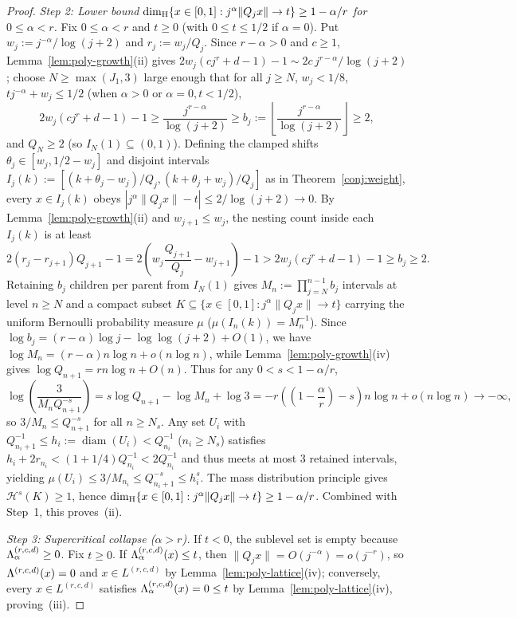 \begin{proof}
\emph{Step 2: Lower bound $\dim_{\mathrm{H}}\{x\in[0,1]:j^\alpha\|Q_jx\|\to t\}\ge1-\alpha/r$
for $0\le\alpha<r$.} Fix $0\le\alpha<r$ and $t\ge0$ (with $0\le t\le1/2$ if
$\alpha=0$). Put $w_j:=j^{-\alpha}/\log(j+2)$ and $r_j:=w_j/Q_j$. Since
$r-\alpha>0$ and $c\ge1$, Lemma~\ref{lem:poly-growth}(ii) gives
$2w_j(cj^r+d-1)-1\sim2c\,j^{r-\alpha}/\log(j+2)$; choose $N\ge\max(J_1,3)$ large
enough that for all $j\ge N$, $w_j<1/8$, $tj^{-\alpha}+w_j\le1/2$ (when
$\alpha>0$ or $\alpha=0,t<1/2$),
\[
2w_j(cj^r+d-1)-1\ge\frac{j^{r-\alpha}}{\log(j+2)}\ge b_j:=\left\lfloor\frac{j^{r-\alpha}}{\log(j+2)}\right\rfloor\ge2,
\]
and $Q_N\ge2$ (so $I_N(1)\subseteq(0,1)$). Defining the clamped shifts
$\theta_j\in[w_j,1/2-w_j]$ and disjoint intervals
$I_j(k):=[(k+\theta_j-w_j)/Q_j,(k+\theta_j+w_j)/Q_j]$ as in
Theorem~\ref{conj:weight}, every $x\in I_j(k)$ obeys
$|j^\alpha\|Q_jx\|-t|\le2/\log(j+2)\to0$. By Lemma~\ref{lem:poly-growth}(ii)
and $w_{j+1}\le w_j$, the nesting count inside each $I_j(k)$ is at least
\[
2(r_j-r_{j+1})Q_{j+1}-1=2\left(w_j\frac{Q_{j+1}}{Q_j}-w_{j+1}\right)-1
>2w_j(cj^r+d-1)-1\ge b_j\ge2.
\]
Retaining $b_j$ children per parent from $I_N(1)$ gives
$M_n:=\prod_{j=N}^{n-1}b_j$ intervals at level $n\ge N$ and a compact subset
$K\subseteq\{x\in[0,1]:j^\alpha\|Q_jx\|\to t\}$ carrying the uniform Bernoulli
probability measure $\mu$ ($\mu(I_n(k))=M_n^{-1}$). Since
$\log b_j=(r-\alpha)\log j-\log\log(j+2)+O(1)$, we have
$\log M_n=(r-\alpha)n\log n+o(n\log n)$, while Lemma~\ref{lem:poly-growth}(iv)
gives $\log Q_{n+1}=rn\log n+O(n)$. Thus for any $0<s<1-\alpha/r$,
\[
\log\left(\frac{3}{M_nQ_{n+1}^{-s}}\right)
=s\log Q_{n+1}-\log M_n+\log3
=-r\left(\left(1-\frac{\alpha}{r}\right)-s\right)n\log n+o(n\log n)\longrightarrow-\infty,
\]
so $3/M_n\le Q_{n+1}^{-s}$ for all $n\ge N_s$. Any set $U_i$ with
$Q_{n_i+1}^{-1}\le h_i:=\operatorname{diam}(U_i)<Q_{n_i}^{-1}$ ($n_i\ge N_s$)
satisfies $h_i+2r_{n_i}<(1+1/4)Q_{n_i}^{-1}<2Q_{n_i}^{-1}$ and thus meets at
most $3$ retained intervals, yielding $\mu(U_i)\le3/M_{n_i}\le Q_{n_i+1}^{-s}\le h_i^s$.
The mass distribution principle gives $\mathcal H^s(K)\ge1$, hence
$\dim_{\mathrm{H}}\{x\in[0,1]:j^\alpha\|Q_jx\|\to t\}\ge1-\alpha/r$. Combined with Step~1,
this proves~(ii).

\emph{Step 3: Supercritical collapse ($\alpha>r$).} If $t<0$, the sublevel set
is empty because $\Lambda_\alpha^{(r,c,d)}\ge0$. Fix $t\ge0$. If
$\Lambda_\alpha^{(r,c,d)}(x)\le t$, then $\|Q_jx\|=O(j^{-\alpha})=o(j^{-r})$, so
$\Lambda^{(r,c,d)}(x)=0$ and $x\in L^{(r,c,d)}$ by Lemma~\ref{lem:poly-lattice}(iv);
conversely, every $x\in L^{(r,c,d)}$ satisfies $\Lambda_\alpha^{(r,c,d)}(x)=0\le t$
by Lemma~\ref{lem:poly-lattice}(iv), proving~(iii).
\end{proof}

